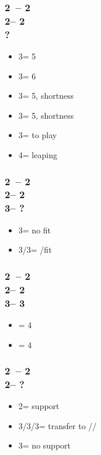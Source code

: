 \subsubsection*{2\clubs\ -- 2\diams\\
                2\hearts -- 2\spades\\
                ?}
\begin{itemize}
    \item 3\clubs = 5\spades
    \item 3\diams = 6\hearts
    \item 3\hearts = 5\spades, \spades shortness
    \item 3\spades = 5\clubs, \spades shortness
    \item 3\nt = to play
    \item 4\minor = leaping
\end{itemize}

\subsubsection*{2\clubs\ -- 2\diams\\
                2\hearts -- 2\spades\\
                3\clubs -- ?}
\begin{itemize}
    \item 3\diams = no fit
    \item 3\hearts/3\spades = \hearts/\spades fit
\end{itemize}

\subsubsection*{2\clubs\ -- 2\diams\\
                2\hearts -- 2\spades\\
                3\clubs -- 3}
\begin{itemize}
    \item {} = 4\clubs
    \item {} = 4\diams
\end{itemize}

\subsubsection*{2\clubs\ -- 2\diams\\
                2\spades -- ?}
\begin{itemize}
    \item 2\nt = support
    \item 3\clubs/3\diams/3\hearts = transfer to \diams/\hearts/\clubs
    \item 3\spades = no support
\end{itemize}

